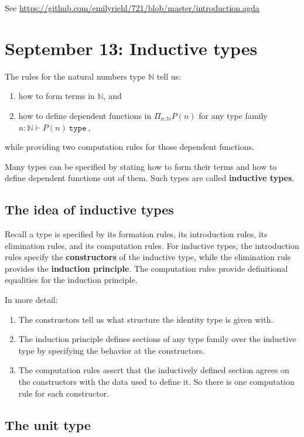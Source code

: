 \documentclass{amsart}
\theoremstyle{theorem}
\theoremstyle{definition}
\theoremstyle{remark}
\newcommand{\0}{\mathbbe{0}}
\newcommand{\1}{\mathbbe{1}}
\newcommand{\2}{\mathbbe{2}}
\newcommand{\3}{\mathbbe{3}}
\newcommand{\4}{\mathbbe{4}}
\newcommand{\univ}{{~\texttt{type}~}}
\newcommand{\bN}{{\mathbb{N}}}
\begin{document}
See \url{https://github.com/emilyriehl/721/blob/master/introduction.agda}


\section*{September 13: Inductive types}

The rules for the natural numbers type $\bN$ tell us:
\begin{enumerate}
\item how to form terms in $\bN$, and
\item how to define dependent functions in $\Pi_{n : \bN} P(n)$ for any type family $n : \bN \vdash P(n) \univ$,
\end{enumerate}
while providing two computation rules for those dependent functions.

Many types can be specified by stating how to form their terms and how to define dependent functions out of them. Such types are called \textbf{inductive types}. 

\subsection*{The idea of inductive types}

Recall a type is specified by its formation rules, its introduction rules, its elimination rules, and its computation rules. For inductive types, the introduction rules specify the \textbf{constructors} of the inductive type, while the elimination rule provides the \textbf{induction principle}. The computation rules provide definitional equalities for the induction principle.

In more detail:
\begin{enumerate}
\item The constructors tell us what structure the identity type is given with.
\item The induction principle defines sections of any type family over the inductive type by specifying the behavior at the constructors.
\item The computation rules assert that the inductively defined section agrees on the constructors with the data used to define it. So there is one computation rule for each constructor.
\end{enumerate}

\subsection*{The unit type}
\end{document}
